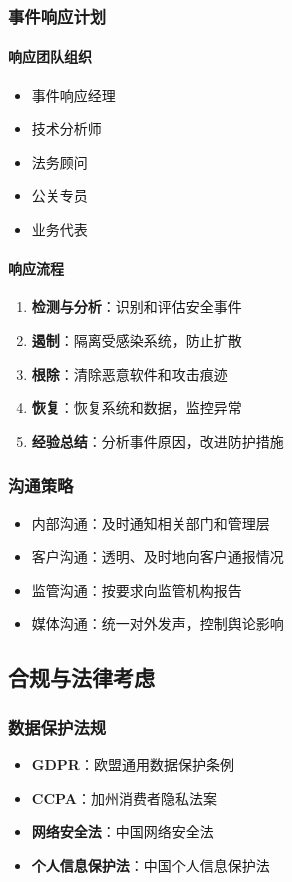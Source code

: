 \documentclass[12pt,a4paper]{article}
\begin{document}
\subsubsection{事件响应计划}

\paragraph{响应团队组织}
\begin{itemize}
    \item 事件响应经理
    \item 技术分析师
    \item 法务顾问
    \item 公关专员
    \item 业务代表
\end{itemize}

\paragraph{响应流程}
\begin{enumerate}
    \item \textbf{检测与分析}：识别和评估安全事件
    \item \textbf{遏制}：隔离受感染系统，防止扩散
    \item \textbf{根除}：清除恶意软件和攻击痕迹
    \item \textbf{恢复}：恢复系统和数据，监控异常
    \item \textbf{经验总结}：分析事件原因，改进防护措施
\end{enumerate}

\subsubsection{沟通策略}
\begin{itemize}
    \item 内部沟通：及时通知相关部门和管理层
    \item 客户沟通：透明、及时地向客户通报情况
    \item 监管沟通：按要求向监管机构报告
    \item 媒体沟通：统一对外发声，控制舆论影响
\end{itemize}

\subsection{合规与法律考虑}

\subsubsection{数据保护法规}
\begin{itemize}
    \item \textbf{GDPR}：欧盟通用数据保护条例
    \item \textbf{CCPA}：加州消费者隐私法案
    \item \textbf{网络安全法}：中国网络安全法
    \item \textbf{个人信息保护法}：中国个人信息保护法
\end{itemize}
\end{document}
